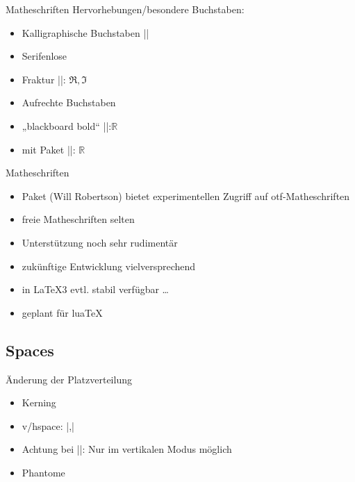 \documentclass[
	vorläufig=false,
	datum=2018-11-12,
	titel={Mathematiksatz II},
	web=true,
	max,
	aspectratio=1610,
]{../tex/latexkurs-slides}
\begin{document}
\begin{frame}[fragile]{Matheschriften}
Hervorhebungen/besondere Buchstaben:
\begin{itemize}
\item Kalligraphische Buchstaben |\mathcal|
\item Serifenlose
\item Fraktur |\Re \Im|: \hfill $\Re, \Im$
\item Aufrechte Buchstaben
\item „blackboard bold“ ||:\hfill $\mathbb R$
\item mit Paket  ||: \hfill$\mathds{R}$
\end{itemize} 
\end{frame}

\begin{frame}[fragile]{Matheschriften}
\begin{itemize}
\item Paket  (Will Robertson) bietet experimentellen Zugriff auf otf-Matheschriften
\item freie Matheschriften selten
\item Unterstützung noch sehr rudimentär
\item zukünftige Entwicklung vielversprechend
\item in \LaTeX3 evtl. stabil verfügbar \dots
\item geplant für lua\TeX
\end{itemize}
\end{frame}


\subsection{Spaces}
\begin{frame}[fragile]{Änderung der Platzverteilung}
\begin{itemize}
\item Kerning
\item v/hspace: |\hspace{1cm},\hspace*{1cm}|
\item Achtung bei |\vspace|: Nur im vertikalen Modus möglich
\item Phantome
\end{itemize}
\end{frame}
\end{document}
